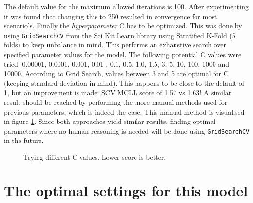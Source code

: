 The default value for the maximum allowed iterations is 100.
After experimenting it was found that changing this to 250 resulted in convergence for most scenario's.
Finally the \textit{hyperparameter} C has to be optimized.
This was done by using \texttt{GridSearchCV} from the Sci Kit Learn library using Stratified K-Fold (5 folds) to keep unbalance in mind.
This performs an exhaustive search over specified parameter values for the model.
The following potential C values were tried: 0.00001, 0.0001, 0.001, 0.01 , 0.1, 0.5, 1.0, 1.5, 3, 5, 10, 100, 1000 and 10000.
According to Grid Search, values between 3 and 5 are optimal for C (keeping standard deviation in mind).
This happens to be close to the default of 1, but an improvement is made: SCV MCLL score of 1.57 vs 1.63!
A similar result should be reached by performing the more manual methods used for previous parameters, which is indeed the case.
This manual method is visualised in figure \ref{fig:2-LBM-model_manual_c}.
Since both approaches yield similar results, finding optimal parameters where no human reasoning is needed will be done using \texttt{GridSearchCV} in the future.


\begin{figure}[H]
    \centering
    \captionsetup{width=0.85\linewidth}
    \captionsetup{justification=centering}
    \caption{Trying different C values. Lower score is better.}
    \label{fig:2-LBM-model_manual_c}
\end{figure}

\section{The optimal settings for this model}
\label{section:LBM_optimal}

